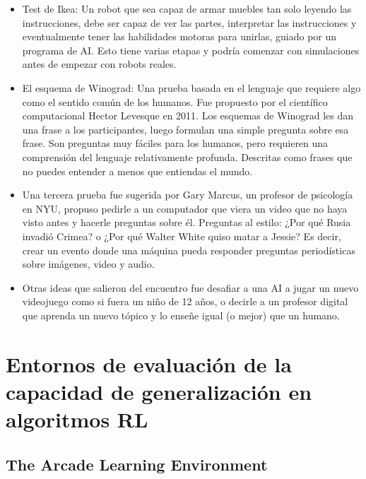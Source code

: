 \begin{itemize}
    \item Test de Ikea: Un robot que sea capaz de armar muebles tan solo leyendo las instrucciones, debe ser capaz de ver las partes, interpretar las instrucciones y eventualmente tener las habilidades motoras para unirlas, guiado por un programa de AI. Esto tiene varias etapas y podría comenzar con simulaciones antes de empezar con robots reales.

    \item El esquema de Winograd: Una prueba basada en el lenguaje que requiere algo como el sentido común de los humanos. Fue propuesto por el científico computacional Hector Levesque en 2011. Los esquemas de Winograd les dan una frase a los participantes, luego formulan una simple pregunta sobre esa frase. Son preguntas muy fáciles para los humanos, pero requieren una comprensión del lenguaje relativamente profunda. Descritas como frases que no puedes entender a menos que entiendas el mundo.
    
    \item Una tercera prueba fue sugerida por Gary Marcus, un profesor de psicología en NYU, propuso pedirle a un computador que viera un video que no haya visto antes y hacerle preguntas sobre él. Preguntas al estilo: ¿Por qué Rusia invadió Crimea? o ¿Por qué Walter White quiso matar a Jessie? Es decir, crear un evento donde una máquina pueda responder preguntas periodísticas sobre imágenes, video y audio.

    \item Otras ideas que salieron del encuentro fue desafiar a una AI a jugar un nuevo videojuego como si fuera un niño de 12 años, o decirle a un profesor digital que aprenda un nuevo tópico y lo enseñe igual (o mejor) que un humano.
\end{itemize}

\section{Entornos de evaluación de la capacidad de generalización en algoritmos RL}\label{section:state-of-the-art:evaluation-enviroments-for-generalization-on-rl-algoritms}

\subsection{The Arcade Learning Environment}\label{section:state-of-the-art:evaluation-enviroments-for-generalization-on-rl-algoritms:ALE}


